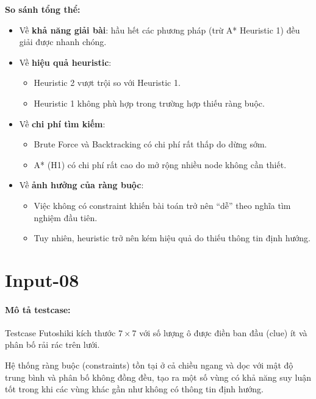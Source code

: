 \textbf{So sánh tổng thể:}

\begin{itemize}
    \item Về \textbf{khả năng giải bài}: hầu hết các phương pháp (trừ A* Heuristic 1) đều giải được nhanh chóng.
    
    \item Về \textbf{hiệu quả heuristic}:
    \begin{itemize}
        \item Heuristic 2 vượt trội so với Heuristic 1.
        \item Heuristic 1 không phù hợp trong trường hợp thiếu ràng buộc.
    \end{itemize}
    
    \item Về \textbf{chi phí tìm kiếm}:
    \begin{itemize}
        \item Brute Force và Backtracking có chi phí rất thấp do dừng sớm.
        \item A* (H1) có chi phí rất cao do mở rộng nhiều node không cần thiết.
    \end{itemize}
    
    \item Về \textbf{ảnh hưởng của ràng buộc}:
    \begin{itemize}
        \item Việc không có constraint khiến bài toán trở nên “dễ” theo nghĩa tìm nghiệm đầu tiên.
        \item Tuy nhiên, heuristic trở nên kém hiệu quả do thiếu thông tin định hướng.
    \end{itemize}

\end{itemize}

\section{Input-08}
\paragraph{Mô tả testcase:}

Testcase Futoshiki kích thước $7 \times 7$ với số lượng ô được điền ban đầu (clue) ít và phân bố rải rác trên lưới. 

Hệ thống ràng buộc (constraints) tồn tại ở cả chiều ngang và dọc với mật độ trung bình và phân bố không đồng đều, tạo ra một số vùng có khả năng suy luận tốt trong khi các vùng khác gần như không có thông tin định hướng.

